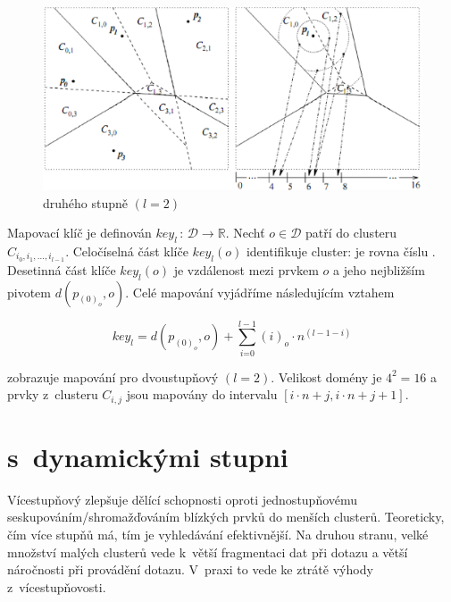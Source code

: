 \begin{figure}[t]
\centering{}\includegraphics[scale=0.5]{m-index-level-two}\caption{\MIndex{} druhého stupně $(l=2)$}
\label{fig:M-Index-level-two}
\end{figure}


Mapovací klíč  je definován $key_{l}\,:\,\mathcal{D\rightarrow\mathbb{R}}$\@.
Nechť $o\in\mathcal{D}$ patří do clusteru $C_{i_{0},i_{1},\ldots,i_{l-1}}$\@.
Celočíselná část klíče $key_{l}(o)$ identifikuje cluster: je rovna
číslu . Desetinná část klíče $key_{l}(o)$
je vzdálenost mezi prvkem $o$ a jeho nejbližším pivotem $d(p_{(0)_{o}},o)$\@.
Celé mapování  vyjádříme následujícím vztahem\cite{Novak:2009:MIE:1637863.1638184}

\begin{equation}
key_{l}=d(p_{(0)_{o}},o)+\sum_{i\text{=0}}^{l-1}(i)_{o}\cdot n{}^{(l-1-i)}\label{eq:M-Index-key}
\end{equation}


\cite{Novak:2009:MIE:1637863.1638184} zobrazuje mapování pro dvoustupňový
\MIndex{} $(l=2)$\@. Velikost domény je $4^{2}=16$ a prvky z~clusteru
$C_{i,j}$ jsou mapovány do intervalu $[i\cdot n+j,i\cdot n+j+1]$\@.


\section{\MIndex{} s~dynamickými stupni\label{sec:Dynamic-Cluster-Tree}}

Vícestupňový \MIndex{} zlepšuje dělící schopnosti oproti jednostupňovému  seskupováním/shromažďováním blízkých prvků do menších clusterů\@.
Teoreticky, čím více stupňů \MIndex{} má, tím je vyhledávání efektivnější.
Na druhou stranu, velké množství malých clusterů vede k~větší fragmentaci dat při dotazu a větší náročnosti při provádění dotazu.
V~praxi to vede ke ztrátě výhody z~vícestupňovosti.


